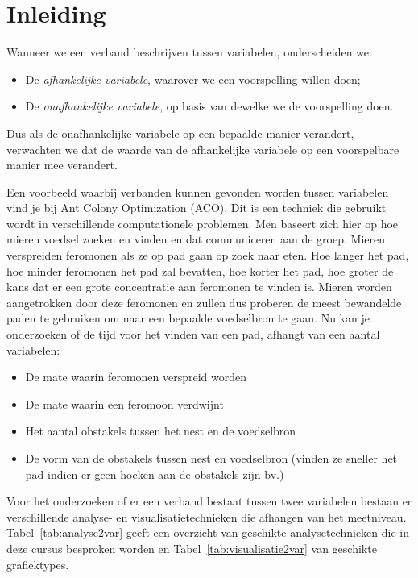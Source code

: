 \section{Inleiding}
\label{sec:analyse2var-inleiding}

Wanneer we een verband beschrijven tussen variabelen, onderscheiden we:

\begin{itemize}
  \item De \emph{afhankelijke variabele}, waarover we een voorspelling willen doen;
  \item De \emph{onafhankelijke variabele}, op basis van dewelke we de voorspelling doen.
\end{itemize}

Dus als de onafhankelijke variabele op een bepaalde manier verandert, verwachten we dat de waarde van de afhankelijke variabele op een voorspelbare manier mee verandert.

\begin{example}
  Een voorbeeld waarbij verbanden kunnen gevonden worden tussen variabelen vind je bij Ant Colony Optimization (ACO). Dit is een techniek die gebruikt wordt in verschillende computationele problemen. Men baseert zich hier op hoe mieren voedsel zoeken en  vinden en dat communiceren aan de groep. Mieren verspreiden feromonen als ze op pad gaan op zoek naar eten. Hoe langer het pad, hoe minder feromonen het pad zal bevatten, hoe korter het pad, hoe groter de kans dat er een grote concentratie aan feromonen te vinden is. Mieren worden aangetrokken door deze feromonen en zullen dus proberen de meest bewandelde paden te gebruiken om naar een bepaalde voedselbron te gaan. Nu kan je onderzoeken of de tijd voor het vinden van een pad, afhangt van een aantal variabelen:

  \begin{itemize}
    \item De mate waarin feromonen verspreid worden
    \item De mate waarin een feromoon verdwijnt
    \item Het aantal obstakels tussen het nest en de voedselbron
    \item De vorm van de obstakels tussen nest en voedselbron (vinden ze sneller het pad indien er geen hoeken aan de obstakels zijn bv.)
  \end{itemize}
\end{example}

Voor het onderzoeken of er een verband bestaat tussen twee variabelen bestaan er verschillende analyse- en visualisatietechnieken die afhangen van het meetniveau. Tabel~\ref{tab:analyse2var} geeft een overzicht van geschikte analysetechnieken die in deze cursus besproken worden en Tabel~\ref{tab:visualisatie2var} van geschikte grafiektypes.

